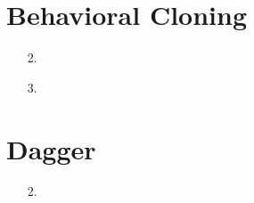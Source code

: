 



\lhead{} 

\section{Behavioral Cloning}
 \begin{itemize}
  \item[2.] 
  \item[3.] 

 \end{itemize}
 
 \section{Dagger}
 \begin{itemize}
  \item[2.] 
 \end{itemize}



